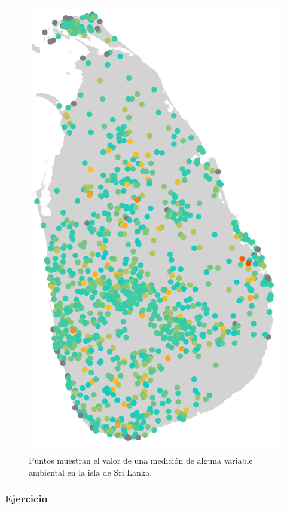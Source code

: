 \documentclass[
]{book}
\begin{document}
\begin{figure}

{\centering \includegraphics[width=10.47in]{Unidad-I/Survey-residuals-snakebites} 

}

\caption{Puntos muestran el valor de una medición de alguna variable ambiental en la isla de Sri Lanka.}\label{fig:unnamed-chunk-8}
\end{figure}

\hypertarget{ejercicio-1}{%
\subsubsection{Ejercicio}\label{ejercicio-1}}
\end{document}

